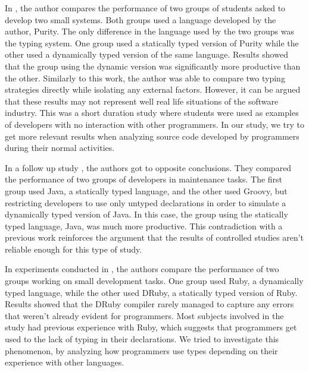\documentclass[preprint]{sigplanconf}
\begin{document}
In \cite{experiment_with_purity}, the author compares the performance of two groups of students asked to develop two small systems. 
Both groups used a language developed by the author, Purity. 
The only difference in the language used by the two groups was the typing system.
One group used a statically typed version of Purity while the other used a dynamically typed version of the same language.
Results showed that the group using the dynamic version was significantly more productive than the other. 
Similarly to this work, the author was able to compare two typing strategies directly while isolating any external factors. 
However, it can be argued that these results may not represent well real life situations of the software industry. 
This was a short duration study where students were used as examples of developers with no interaction with other programmers. 
In our study, we try to get more relevant results when analyzing source code developed by programmers during their normal activities.

In a follow up study \cite{hanenberg_icpc}, the authors got to opposite conclusions. 
They compared the performance of two groups of developers in maintenance tasks. 
The first group used Java, a statically typed language, and the other used Groovy, but restricting developers to use only untyped declarations in order to simulate a dynamically typed version of Java.
In this case, the group using the statically typed language, Java, was much more productive.
This contradiction with a previous work reinforces the argument that the results of controlled studies aren't reliable enough for this type of study.

In experiments conducted in \cite{ruby_vs_druby}, the authors compare the performance of two groups working on small development tasks.
One group used Ruby, a dynamically typed language, while the other used DRuby, a statically typed version of Ruby. 
Results showed that the DRuby compiler rarely managed to capture any errors that weren't already evident for programmers.
Most subjects involved in the study had previous experience with Ruby, which suggests that programmers get used to the lack of typing in their declarations.
We tried to investigate this phenomenon, by analyzing how programmers use types depending on their experience with other languages.
\end{document}
